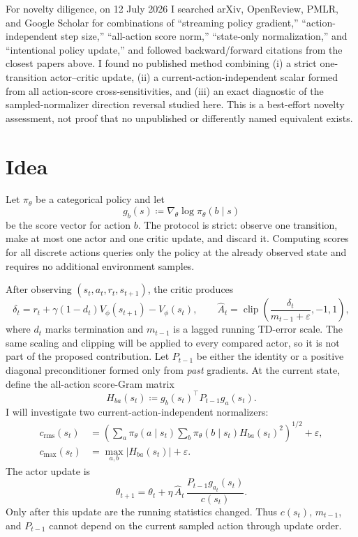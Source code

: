 \documentclass{article}
\newcommand{\clip}{\operatorname{clip}}
\begin{document}
For novelty diligence, on 12 July 2026 I searched arXiv, OpenReview, PMLR, and Google Scholar for combinations of ``streaming policy gradient,'' ``action-independent step size,'' ``all-action score norm,'' ``state-only normalization,'' and ``intentional policy update,'' and followed backward/forward citations from the closest papers above. I found no published method combining (i) a strict one-transition actor--critic update, (ii) a current-action-independent scalar formed from all action-score cross-sensitivities, and (iii) an exact diagnostic of the sampled-normalizer direction reversal studied here. This is a best-effort novelty assessment, not proof that no unpublished or differently named equivalent exists.

\section{Idea}
Let $\pi_\theta$ be a categorical policy and let
\begin{equation}
    g_b(s) \coloneqq \nabla_\theta \log \pi_\theta(b\mid s)
\end{equation}
be the score vector for action $b$. The protocol is strict: observe one transition, make at most one actor and one critic update, and discard it. Computing scores for all discrete actions queries only the policy at the already observed state and requires no additional environment samples.

After observing $(s_t,a_t,r_t,s_{t+1})$, the critic produces
\begin{equation}
    \delta_t = r_t + \gamma(1-d_t)V_\phi(s_{t+1})-V_\phi(s_t),
    \qquad
    \widehat A_t = \clip\!\left(\frac{\delta_t}{m_{t-1}+\varepsilon},-1,1\right),
\end{equation}
where $d_t$ marks termination and $m_{t-1}$ is a lagged running TD-error scale. The same scaling and clipping will be applied to every compared actor, so it is not part of the proposed contribution. Let $P_{t-1}$ be either the identity or a positive diagonal preconditioner formed only from \emph{past} gradients. At the current state, define the all-action score-Gram matrix
\begin{equation}
    H_{ba}(s_t) \coloneqq g_b(s_t)^\top P_{t-1}g_a(s_t).
\end{equation}
I will investigate two current-action-independent normalizers:
\begin{align}
    c_{\mathrm{rms}}(s_t)
    &= \left(\sum_a\pi_\theta(a\mid s_t)\sum_b\pi_\theta(b\mid s_t)H_{ba}(s_t)^2\right)^{1/2}+\varepsilon, \\
    c_{\max}(s_t)
    &= \max_{a,b}\lvert H_{ba}(s_t)\rvert+\varepsilon.
\end{align}
The actor update is
\begin{equation}
    \theta_{t+1}=\theta_t+
    \eta\,\widehat A_t\,
    \frac{P_{t-1}g_{a_t}(s_t)}{c(s_t)}.
    \label{eq:aim-update}
\end{equation}
Only after this update are the running statistics changed. Thus $c(s_t)$, $m_{t-1}$, and $P_{t-1}$ cannot depend on the current sampled action through update order.
\end{document}
